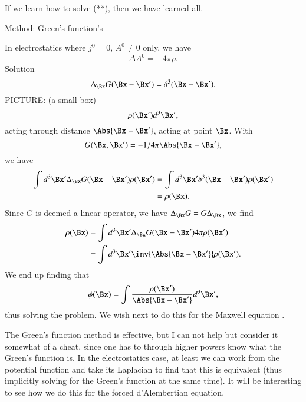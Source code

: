 If we learn how to solve (**), then we have learned all.

Method: Green's function's

In electrostatics where \(j^0 = 0\), \(A^0 \ne 0\) only, we have
%
\begin{equation}\label{eqn:relativisticElectrodynamicsL17b:330}
\Delta A^0 = -4 \pi \rho.
\end{equation}
Solution
%
\begin{equation}\label{eqn:relativisticElectrodynamicsL17b:350}
\Delta_{\Bx} G(\Bx - \Bx') = \delta^3( \Bx - \Bx').
\end{equation}
%
PICTURE: (a small box)
%
\begin{equation}\label{eqn:relativisticElectrodynamicsL17b:370}
\rho(\Bx') d^3 \Bx',
\end{equation}
acting through distance \(\Abs{\Bx - \Bx'}\), acting at point \(\Bx\).  With
\begin{equation}\label{eqn:relativisticElectrodynamicsL17b:371}
G(\Bx, \Bx') = -1/4 \pi\Abs{\Bx - \Bx'},
\end{equation}
we have
%
\begin{equation}\label{eqn:relativisticElectrodynamicsL17b:410}
\begin{aligned}
\int d^3 \Bx' \Delta_{\Bx} G(\Bx - \Bx') \rho(\Bx')
&= \int d^3 \Bx' \delta^3( \Bx - \Bx') \rho(\Bx') \\
&= \rho(\Bx).
\end{aligned}
\end{equation}
Since \(G\) is deemed a linear operator, we have \(\Delta_\Bx G = G \Delta_\Bx\), we find
%
\begin{equation}\label{eqn:relativisticElectrodynamicsL17b:430}
\begin{aligned}
\rho(\Bx)
&=
\int d^3 \Bx' \Delta_{\Bx} G(\Bx - \Bx') 4 \pi \rho(\Bx') \\
&=
\int d^3 \Bx' \inv{\Abs{\Bx - \Bx'}} \rho(\Bx').
\end{aligned}
\end{equation}
We end up finding that
%
\begin{equation}\label{eqn:relativisticElectrodynamicsL17b:390}
\phi(\Bx) = \int \frac{\rho(\Bx')}{\Abs{\Bx - \Bx'}} d^3 \Bx',
\end{equation}
thus solving the problem.  We wish next to do this for the Maxwell equation .

The Green's function method is effective, but I can not help but consider it somewhat of a cheat, since one has to through higher powers know what the Green's function is.  In the electrostatics case, at least we can work from the potential function and take its Laplacian to find that this is equivalent (thus implicitly solving for the Green's function at the same time).  It will be interesting to see how we do this for the forced d'Alembertian equation.
